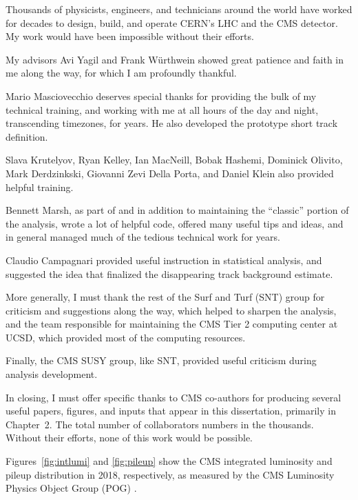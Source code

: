\begin{frontmatter}
%
%
\begin{acknowledgements}
Thousands of physicists, engineers, and technicians around the world have worked for decades to design, build, and operate CERN's LHC and the CMS detector.
My work would have been impossible without their efforts.

My advisors Avi Yagil and Frank W\"urthwein showed great patience and faith in me along the way, for which I am profoundly thankful.

Mario Masciovecchio deserves special thanks for providing the bulk of my technical training, and working with me at all hours of the day and night, transcending timezones, for years. 
He also developed the prototype short track definition.

Slava Krutelyov, Ryan Kelley, Ian MacNeill, Bobak Hashemi, Dominick Olivito, Mark Derdzinkski, Giovanni Zevi Della Porta, and Daniel Klein also provided helpful training.

Bennett Marsh, as part of and in addition to maintaining the ``classic'' portion of the analysis, wrote a lot of helpful code, offered many useful tips and ideas, and in general managed much of the tedious technical work for years.

Claudio Campagnari provided useful instruction in statistical analysis, and suggested the idea that finalized the disappearing track background estimate.

More generally, I must thank the rest of the Surf and Turf (SNT) group for criticism and suggestions along the way, which helped to sharpen the analysis, and the team responsible for maintaining the CMS Tier 2 computing center at UCSD, which provided most of the computing resources.

Finally, the CMS SUSY group, like SNT, provided useful criticism during analysis development.

In closing, I must offer specific thanks to CMS co-authors for producing several useful papers, figures, and inputs that appear in this dissertation, primarily in Chapter~2.
The total number of collaborators numbers in the thousands.
Without their efforts, none of this work would be possible.

Figures~\ref{fig:intlumi} and \ref{fig:pileup} show the CMS integrated luminosity and pileup distribution in 2018, respectively, as measured by the CMS Luminosity Physics Object Group (POG) \cite{lumipublic}.


\end{acknowledgements}
\end{frontmatter}
